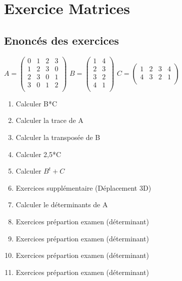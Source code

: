 
\newpage
\section{Exercice Matrices}
\vspace{10mm} %
\subsection{Enoncés des exercices}
\vspace{5mm} %

$
A =
\begin{pmatrix}
  0 & 1 & 2 & 3 \\
  1 & 2 & 3 & 0 \\
  2 & 3 & 0 & 1 \\
  3 & 0 & 1 & 2 \\
\end{pmatrix}
$
\vspace{5mm} %
$
B =
\begin{pmatrix}
  1 & 4 \\
  2 & 3 \\
  3 & 2 \\
  4 & 1 \\
\end{pmatrix}
$
\vspace{5mm} %
$
C =
\begin{pmatrix}
  1 & 2 & 3 & 4 \\
  4 & 3 & 2 & 1 \\
\end{pmatrix}
$
\vspace{3mm} %

\begin{enumerate}[label=\Alph*)]
\item Calculer B*C
\item Calculer la trace de A
\item Calculer la transposée de B
\item Calculer 2,5*C
\item Calculer $B^{t}+C$
\item Exercices supplémentaire (Déplacement 3D)
\item Calculer le déterminants de A
\item Exercices prépartion examen (déterminant)
\item Exercices prépartion examen (déterminant)
\item Exercices prépartion examen (déterminant)
\item Exercices prépartion examen (déterminant)
\end{enumerate}

